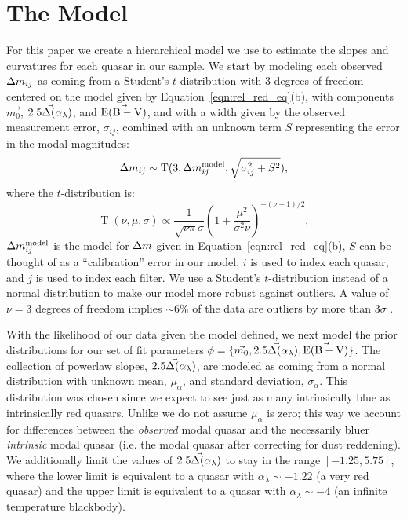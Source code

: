 \section{The Model} \label{sec:mcmc_model}

For this paper we create a hierarchical model we use to estimate the slopes and curvatures for each quasar in our sample.
We start by modeling each observed $\Delta m_{ij}$ as coming from a Student's $t$-distribution with 3 degrees of freedom %
centered on the model given by Equation~\ref{eqn:rel_red_eq}(b), with components $\vec{m_0}$, $\vec{2.5\Delta(\alpha_{\lambda})}$, and $\vec{{\rm E(B-V)}}$, and with a width given by the observed measurement error, $\sigma_{ij}$, combined with an unknown term $S$ representing the error in the modal magnitudes:
\begin{equation} \label{eqn:model}
 \mrel_{ij} \sim \operatorname{T}(3,\mrel_{ij}^{\rm model},\sqrt{\sigma_{ij}^2+S^2}),
\end{equation}
where the $t$-distribution is:
\begin{equation}
 \operatorname{T}(\nu,\mu,\sigma) \propto \frac{1}{\sqrt{\nu \pi}\sigma} \left( 1 + \frac{\mu^2}{\sigma^2 \nu} \right)^{-(\nu+1)/2},
\end{equation}
$\Delta m_{ij}^{\rm model}$ is the model for $\Delta m$ given in Equation~\ref{eqn:rel_red_eq}(b), $S$ can be thought of as a ``calibration'' error in our model, $i$ is used to index each quasar, and $j$ is used to index each filter. We use a Student's $t$-distribution instead of a normal distribution to make our model more robust against outliers. A value of $\nu=3$ degrees of freedom implies $\sim6\%$ of the data are outliers by more than 3$\sigma$ \citep{Kelly:2012}.

With the likelihood of our data given the model defined, we next model the prior distributions for our set of fit parameters $\phi=\{ \vec{m_0}, \vec{2.5\Delta(\alpha_{\lambda})}, \vec{{\rm E(B-V)}} \}$.  The collection of powerlaw slopes, $\vec{2.5\Delta(\alpha_{\lambda})}$, are modeled as coming from a normal distribution with unknown mean, $\mu_{\alpha}$, and standard deviation, $\sigma_{\alpha}$. This distribution was chosen since we expect to see just as many intrinsically blue as intrinsically red quasars.  Unlike \citet{Hopkins:2004} we do not assume $\mu_{\alpha}$ is zero; this way we account for differences between the {\em observed} modal quasar and the necessarily bluer {\em intrinsic} modal quasar (i.e. the modal quasar after correcting for dust reddening). We additionally limit the values of $\vec{2.5\Delta(\alpha_{\lambda})}$ to stay in the range $[-1.25,5.75]$, where the lower limit is equivalent to a quasar with $\alpha_{\lambda} \sim -1.22$ (a very red quasar) and the upper limit is equivalent to a quasar with $\alpha_{\lambda} \sim -4$ (an infinite temperature blackbody).

